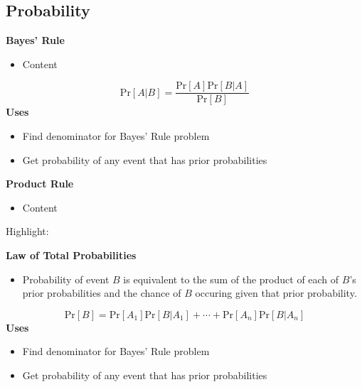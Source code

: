 \documentclass{article}\usepackage{amsmath,amssymb,amsthm,tikz,tkz-graph,color,chngpage,soul,hyperref,csquotes,graphicx,floatrow, listings}\newcommand*{\QEDB}{\hfill\ensuremath{\square}}\newtheorem*{prop}{Proposition}\renewcommand{\theenumi}{\alph{enumi}}\usepackage[shortlabels]{enumitem}\usepackage[nobreak=true]{mdframed}\usetikzlibrary{matrix,calc}\MakeOuterQuote{"}\usepackage[margin=0.75in]{geometry} \newtheorem{theorem}{Theorem}\newcommand{\Z}{\mathbb Z}\newcommand{\R}{\mathbb R}\newcommand{\Q}{\mathbb Q}\newcommand{\N}{\mathbb N}\newcommand{\x}[1]{\textrm{ #1 }}\newcommand{\pr}{\textrm{Pr}}
\newcommand{\eq}[1]{\begin{equation}#1\end{equation}}
\begin{document}
\subsection*{Probability}
\textbf{Bayes' Rule}
\begin{itemize}
    \item Content
\end{itemize}
\begin{mdframed}
\eq{\pr[A|B]=\frac{\pr[A]\pr[B|A]}{\pr[B]}}
\textbf{Uses}
\begin{itemize}
    \item Find denominator for Bayes' Rule problem
    \item Get probability of any event that has prior probabilities
\end{itemize}
\end{mdframed}
\textbf{Product Rule}
\begin{itemize}
    \item Content
\end{itemize}
\begin{mdframed}
Highlight:
\end{mdframed}
\textbf{Law of Total Probabilities}
\begin{itemize}
    \item Probability of event $B$ is equivalent to the sum of the product of each of $B$'s prior probabilities and the chance of $B$ occuring given that prior probability.
\end{itemize}
\begin{mdframed}
\eq{\pr[B]=\pr[A_1]\pr[B|A_1]+\cdots+\pr[A_n]\pr[B|A_n]}
\textbf{Uses}
\begin{itemize}
    \item Find denominator for Bayes' Rule problem
    \item Get probability of any event that has prior probabilities
\end{itemize}
\end{mdframed}
\end{document}
